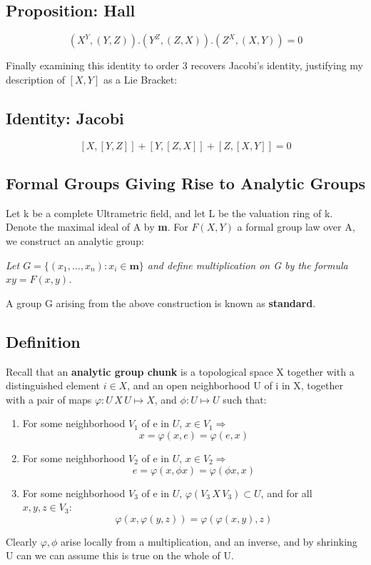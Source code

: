 \subsection{Proposition: Hall}\label{df2.3.10}
$$(X^Y,(Y,Z)).(Y^Z,(Z,X)).(Z^X,(X,Y)) = 0$$

Finally examining this identity to order 3 recovers Jacobi's
identity, justifying my description of $[X,Y]$ as a Lie Bracket:

\subsection{Identity: Jacobi}\label{df2.3.11}
$$[X,[Y,Z]]+[Y,[Z,X]]+[Z,[X,Y]] = 0$$




\subsection{Formal Groups Giving Rise to Analytic
Groups}\label{df2.4}

Let k be a complete Ultrametric field, and let L be the valuation
ring of k. Denote the maximal ideal of A by \textbf m. For
$F(X,Y)$ a formal group law over A, we construct an analytic
group:

\emph{Let $G=\{(x_1,\dots , x_n): x_i \in \textbf{m}\}$ and define
multiplication on G by the formula $xy=F(x,y)$.}

A group G arising from the above construction is known as
\textbf{standard}.

\subsection*{Definition}
Recall that an \textbf{analytic group chunk} is a topological
space X together with a distinguished element $i\in X$, and an
open neighborhood U of i in X, together with a pair of maps
$\varphi:U\,X\,U\mapsto X$, and $\phi:U\mapsto U$ such that:
\begin{enumerate}
    \item For some neighborhood $V_1$ of e in $U$, $x\in V_1 \Rightarrow$
    $$x= \varphi(x,e) = \varphi(e,x)$$
    \item For some neighborhood $V_2$ of e in $U$, $x\in V_2
    \Rightarrow$
    $$e=\varphi(x,\phi x) = \varphi (\phi x, x)$$
    \item For some neighborhood $V_3$ of e in $U$,
    $\varphi(V_3\,X\, V_3) \subset U$, and for all \\ $x,y,z\in V_3$:
    $$\varphi(x,\varphi(y,z)) = \varphi(\varphi(x,y),z)$$
\end{enumerate}
Clearly $\varphi, \phi$ arise locally from a multiplication, and
an inverse, and by shrinking U can we can assume this is true on
the whole of U.

